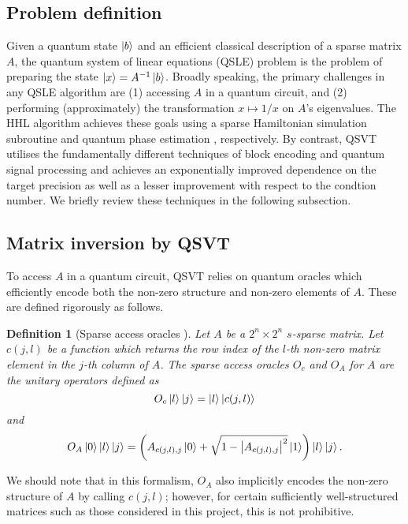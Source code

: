 \documentclass[10pt, twocolumn]{article}
\newtheorem{definition}[theorem]{Definition}
\begin{document}
\subsection{Problem definition}

Given a quantum state $\ket{b}$ and an efficient classical description of a sparse matrix $A$, the quantum system of linear equations (QSLE) problem is the problem of preparing the state $\ket{x} = A^{-1} \ket{b}$. Broadly speaking, the primary challenges in any QSLE algorithm are (1) accessing $A$ in a quantum circuit, and (2) performing (approximately) the transformation $x \mapsto 1/x$ on $A$'s eigenvalues. The HHL algorithm \cite{harrow2009quantum} achieves these goals using a sparse Hamiltonian simulation subroutine \cite{berry2007efficient} and quantum phase estimation \cite{kitaev1995quantum}, respectively. By contrast, QSVT utilises the fundamentally different techniques of block encoding \cite{gilyen2019quantum} and quantum signal processing \cite{low2017optimal} and achieves an exponentially improved dependence on the target precision as well as a lesser improvement with respect to the condtion number. We briefly review these techniques in the following subsection.

\subsection{Matrix inversion by QSVT}

To access $A$ in a quantum circuit, QSVT relies on quantum oracles which efficiently encode both the non-zero structure and non-zero elements of $A$. These are defined rigorously as follows.

\begin{definition}[Sparse access oracles \cite{camps2203explicit}]
	\label{def::sparse_access_oracles}
	Let $A$ be a $2^n \times 2^n$ $s$-sparse matrix. Let $c(j,l)$ be a function which returns the row index of the $l$-th non-zero matrix element in the $j$-th column of $A$. The sparse access oracles $O_c$ and $O_A$ for $A$ are the unitary operators defined as
	\[
		O_c \ket{l}\ket{j} = \ket{l}\ket{c(j, l)}
	\]
	and
	\[
		O_A \ket{0}\ket{l}\ket{j} = \left( A_{c(j, l), j} \ket{0} + \sqrt{1 - \abs{A_{c(j, l), j}}^2 } \ket{1} \right) \ket{l} \ket{j}.
	\]
\end{definition}

We should note that in this formalism, $O_A$ also implicitly encodes the non-zero structure of $A$ by calling $c(j, l)$; however, for certain sufficiently well-structured matrices such as those considered in this project, this is not prohibitive.
\end{document}

